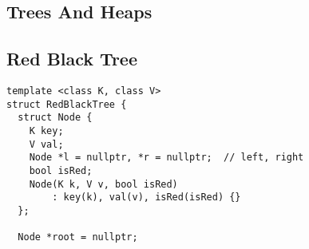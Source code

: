 \documentclass[twoside]{article}
\begin{document}
\begin{multicols*}{2}
\sectionfont{\bfseries\sffamily\centering\Huge}
\vspace{1em}
\section*{Trees And Heaps}
\vspace{3em}
\subsectionfont{\large\bfseries\sffamily\underline}
\subsection*{Red Black Tree}
\begin{verbatim}
template <class K, class V>
struct RedBlackTree {
  struct Node {
    K key;
    V val;
    Node *l = nullptr, *r = nullptr;  // left, right
    bool isRed;
    Node(K k, V v, bool isRed)
        : key(k), val(v), isRed(isRed) {}
  };

  Node *root = nullptr;
  

\end{verbatim}
\end{multicols*}
\end{document}
